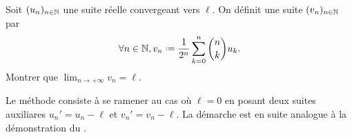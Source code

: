 
\begin{exercice}
    Soit $(u_n)_{n \in \mathbb{N}}$ une suite réelle convergeant vers $\ell$. On définit une suite $(v_n)_{n \in \mathbb{N}}$ par 
    $$\forall n \in \N, v_n \defeq \frac{1}{2^n} \sum_{k=0}^{n} \binom{n}{k} u_k.$$
    Montrer que $\displaystyle \lim_{n \rightarrow + \infty} v_n = \ell$.
\end{exercice}

\begin{elem_sol}
    Le méthode consiste à se ramener au cas où $\ell = 0$ en posant deux suites auxiliares $u_n'=u_n - \ell$ et $v_n' = v_n - \ell$. La démarche est en suite analogue à la démonstration du .
\end{elem_sol}
